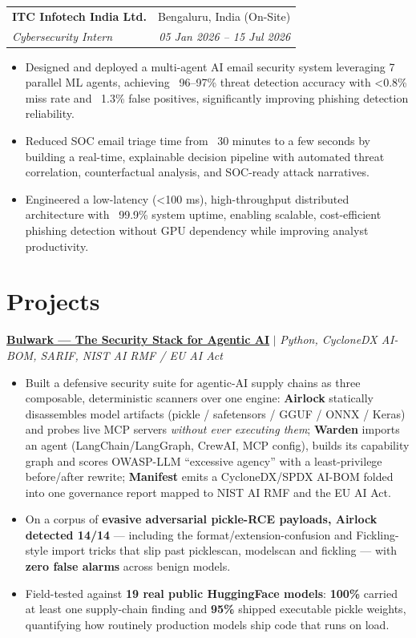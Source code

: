 \documentclass[11pt,a4paper]{article}
\newcommand{\resumeSubheading}[4]{
  \item[]
    \begin{tabularx}{\textwidth}{X r}
      \textbf{#1} & #2 \\
      \textit{#3} & \textit{#4}
    \end{tabularx}
}
\begin{document}
\vspace{3pt}
\resumeSubheading
{ITC Infotech India Ltd.}{Bengaluru, India (On-Site)}
{Cybersecurity Intern}{05 Jan 2026 -- 15 Jul 2026}
\begin{itemize}
    \item Designed and deployed a multi-agent AI email security system leveraging 7 parallel ML agents, achieving ~96–97\% threat detection accuracy with <0.8\% miss rate and ~1.3\% false positives, significantly improving phishing detection reliability.
    \item Reduced SOC email triage time from ~30 minutes to a few seconds by building a real-time, explainable decision pipeline with automated threat correlation, counterfactual analysis, and SOC-ready attack narratives.
    \item Engineered a low-latency (<100 ms), high-throughput distributed architecture with ~99.9\% system uptime, enabling scalable, cost-efficient phishing detection without GPU dependency while improving analyst productivity.
\end{itemize}

\vspace{-2pt}

\section{Projects}
\vspace{-2pt}
\href{https://github.com/mk12002/Bulwark}{\textbf{Bulwark — The Security Stack for Agentic AI}} $|$ \textit{Python, CycloneDX AI-BOM, SARIF, NIST AI RMF / EU AI Act}
\begin{itemize}
    \item Built a defensive security suite for agentic-AI supply chains as three composable, deterministic scanners over one engine: \textbf{Airlock} statically disassembles model artifacts (pickle / safetensors / GGUF / ONNX / Keras) and probes live MCP servers \textit{without ever executing them}; \textbf{Warden} imports an agent (LangChain/LangGraph, CrewAI, MCP config), builds its capability graph and scores OWASP-LLM ``excessive agency'' with a least-privilege before/after rewrite; \textbf{Manifest} emits a CycloneDX/SPDX AI-BOM folded into one governance report mapped to NIST AI RMF and the EU AI Act.
    \item On a corpus of \textbf{evasive adversarial pickle-RCE payloads, Airlock detected 14/14} — including the format/extension-confusion and Fickling-style import tricks that slip past picklescan, modelscan and fickling — with \textbf{zero false alarms} across benign models.
    \item Field-tested against \textbf{19 real public HuggingFace models}: \textbf{100\%} carried at least one supply-chain finding and \textbf{95\%} shipped executable pickle weights, quantifying how routinely production models ship code that runs on load.
\end{itemize}
\end{document}
